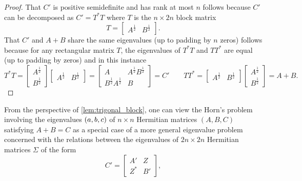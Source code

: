 \documentclass[notitlepage, 10pt]{article}
\begin{document}
\begin{proof}
    That $C'$ is positive semidefinite and has rank at most $n$ follows because $C'$ can be decomposed as $C' = T^{*} T$ where $T$ is the $n \times 2n$ block matrix
    \begin{equation}
        T = \begin{bmatrix} A^{\frac{1}{2}} & B^{\frac{1}{2}} \end{bmatrix}.
    \end{equation}
    That $C'$ and $A+B$ share the same eigenvalues (up to padding by $n$ zeros) follows because for any rectangular matrix $T$, the eigenvalues of $T^{*}T$ and $TT^{*}$ are equal (up to padding by zeros) and in this instance
    \begin{equation}
        T^{*}T =
        \begin{bmatrix} A^{\frac{1}{2}} \\ B^{\frac{1}{2}} \end{bmatrix}
        \begin{bmatrix} A^{\frac{1}{2}} & B^{\frac{1}{2}} \end{bmatrix}
        =
        \begin{bmatrix}
            A & A^{\frac{1}{2}}B^{\frac{1}{2}} \\
            B^{\frac{1}{2}}A^{\frac{1}{2}} & B
        \end{bmatrix}
        = C'
        \qquad
        TT^{*} =
        \begin{bmatrix} A^{\frac{1}{2}} & B^{\frac{1}{2}} \end{bmatrix}
        \begin{bmatrix} A^{\frac{1}{2}} \\ B^{\frac{1}{2}} \end{bmatrix}
        = A + B.
    \end{equation}
\end{proof}
From the perspective of \cref{lem:trigonal_block}, one can view the Horn's problem involving the eigenvalues $(a,b,c)$ of $n\times n$ Hermitian matrices $(A,B,C)$ satisfying $A+B=C$ as a special case of a more general eigenvalue problem concerned with the relations between the eigenvalues of $2n \times 2n$ Hermitian matrices $\Sigma$ of the form
\begin{equation}
    \label{eq:block_ABX}
    C' = \begin{bmatrix}
        A' & Z \\
        Z^{*} & B'
    \end{bmatrix},
\end{equation}
\end{document}
